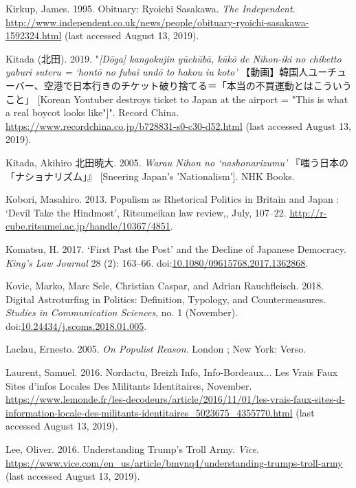 \documentclass[10pt,british,A4paper,twoside]{memoir}
\begin{document}
\hypertarget{ref-kirkup_obituary:_1995}{}
Kirkup, James. 1995. Obituary: Ryoichi Sasakawa. \emph{The Independent}.
\url{http://www.independent.co.uk/news/people/obituary-ryoichi-sasakawa-1592324.html} (last accessed August 13, 2019).

\hypertarget{ref-kitada_eng._2019}{}
Kitada (北田). 2019. "\emph{[Dōga] kangokujin yūchūbā, kūkō de Nihon-iki no chiketto yaburi suteru = `hontō no fubai undō to hakou iu koto'} 【動画】韓国人ユーチューバー、空港で日本行きのチケット破り捨てる＝「本当の不買運動とはこういうこと」 [Korean Youtuber destroys ticket to Japan at the airport = "This is what a real boycot looks like"]".
Record China. \url{https://www.recordchina.co.jp/b728831-s0-c30-d52.html} (last accessed August 13, 2019).

\hypertarget{ref-kitada_eng:_2005}{}
Kitada, Akihiro 北田暁大. 2005. \emph{Warau Nihon no `nashonarizumu'} 『嗤う日本の「ナショナリズム」』 [Sneering Japan's 'Nationalism'].
NHK Books.

\hypertarget{ref-kobori_populism_2013}{}
Kobori, Masahiro. 2013. Populism as Rhetorical Politics in Britain and
Japan : `Devil Take the Hindmost', Ritsumeikan law review,, July,
107--22. \url{http://r-cube.ritsumei.ac.jp/handle/10367/4851}.

\hypertarget{ref-komatsu_first_2017}{}
Komatsu, H. 2017. `First Past the Post' and the Decline of Japanese
Democracy. \emph{King's Law Journal} 28 (2): 163--66.
doi:\href{https://doi.org/10.1080/09615768.2017.1362868}{10.1080/09615768.2017.1362868}.

\hypertarget{ref-kovic_digital_2018}{}
Kovic, Marko, Marc Sele, Christian Caspar, and Adrian Rauchfleisch.
2018. Digital Astroturfing in Politics: Definition, Typology, and
Countermeasures. \emph{Studies in Communication Sciences}, no. 1
(November).
doi:\href{https://doi.org/10.24434/j.scoms.2018.01.005}{10.24434/j.scoms.2018.01.005}.

\hypertarget{ref-laclau_populist_2005}{}
Laclau, Ernesto. 2005. \emph{On Populist Reason}. London ; New York:
Verso.

\hypertarget{ref-laurent_nordactu_2016}{}
Laurent, Samuel. 2016. Nordactu, Breizh Info, Info-Bordeaux... Les Vrais
Faux Sites d'infos Locales Des Militants Identitaires, November.
\url{https://www.lemonde.fr/les-decodeurs/article/2016/11/01/les-vrais-faux-sites-d-information-locale-des-militants-identitaires_5023675_4355770.html} (last accessed August 13, 2019).

\hypertarget{ref-lee_understanding_2016}{}
Lee, Oliver. 2016. Understanding Trump's Troll Army. \emph{Vice}.
\url{https://www.vice.com/en_us/article/bmvnq4/understanding-trumps-troll-army} (last accessed August 13, 2019).
\end{document}
